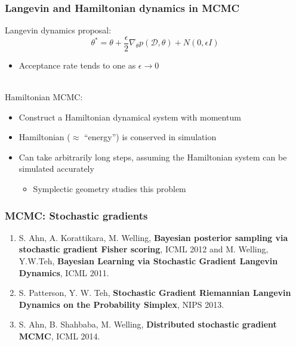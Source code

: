 \documentclass{beamer}
\newcommand{\dataset}{\mathcal{D}}
\newcommand{\parameters}{\theta}
\begin{document}
\begin{frame}
  \frametitle{Langevin and Hamiltonian dynamics in MCMC}

  Langevin dynamics proposal:
  $$ \parameters^* = \parameters + \frac{\epsilon}{2} \nabla_\parameters p(\dataset, \parameters) + N(0, \epsilon I) $$
  \begin{itemize}
  \item Acceptance rate tends to one as $\epsilon \rightarrow 0$
  \end{itemize}
  \mbox{}\\
  Hamiltonian MCMC:
  \begin{itemize}
  \item Construct a Hamiltonian dynamical system with momentum
  \item Hamiltonian ($\approx$ ``energy'') is conserved in simulation
  \item Can take arbitrarily long steps, assuming the Hamiltonian
    system can be simulated accurately
    \begin{itemize}
    \item Symplectic geometry studies this problem
    \end{itemize}
  \end{itemize}
\end{frame}

\begin{frame}[allowframebreaks]
  \frametitle{MCMC: Stochastic gradients}

  \begin{enumerate}
  \item S. Ahn, A. Korattikara, M. Welling, \textbf{Bayesian posterior sampling via stochastic gradient Fisher scoring}, ICML 2012 and M. Welling, Y.W.Teh, \textbf{Bayesian Learning via Stochastic Gradient Langevin Dynamics}, ICML 2011.
  \item S. Patterson, Y. W. Teh, \textbf{Stochastic Gradient Riemannian Langevin Dynamics on the Probability Simplex}, NIPS 2013.
  \item S. Ahn, B. Shahbaba, M. Welling, \textbf{Distributed stochastic gradient MCMC}, ICML 2014.
  \end{enumerate}
\end{frame}
\end{document}
